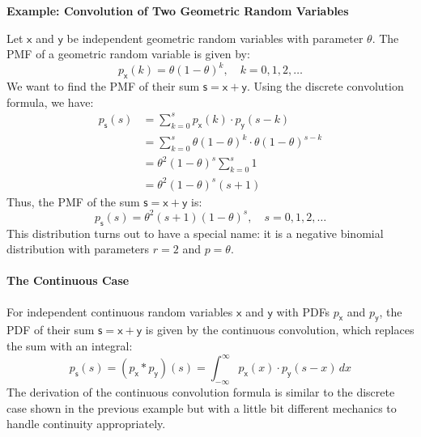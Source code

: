 \begin{exampleBox}
\textbf{Example: Convolution of Two Geometric Random Variables}

Let $\mathsf{x}$ and $\mathsf{y}$ be independent geometric random variables with parameter $\theta$. The PMF of a geometric random variable is given by:
\begin{equation}
    p_{\mathsf{x}}(k) = \theta (1-\theta)^{k} , \quad k = 0, 1, 2, \ldots
\end{equation} 
We want to find the PMF of their sum $\mathsf{s} = \mathsf{x} + \mathsf{y}$. Using the discrete convolution formula, we have:
\begin{align}
    p_{\mathsf{s}}(s) &= \sum_{k=0}^{s} p_{\mathsf{x}}(k) \cdot p_{\mathsf{y}}(s-k) \\
    &= \sum_{k=0}^{s} \theta (1-\theta)^{k} \cdot \theta (1-\theta)^{s-k} \\
    &= \theta^2 (1-\theta)^{s} \sum_{k=0}^{s} 1 \\
    &= \theta^2 (1-\theta)^{s} (s + 1)
\end{align}
Thus, the PMF of the sum $\mathsf{s} = \mathsf{x} + \mathsf{y}$ is:
\begin{equation}
    p_{\mathsf{s}}(s) = \theta^2 (s + 1) (1-\theta)^{s}, \quad s = 0, 1, 2, \ldots
\end{equation}
This distribution turns out to have a special name: it is a negative binomial distribution with parameters $r=2$ and $p=\theta$.
\end{exampleBox}

\paragraph*{The Continuous Case}
For independent continuous random variables $\mathsf{x}$ and $\mathsf{y}$ with PDFs $p_{\mathsf{x}}$ and $p_{\mathsf{y}}$, the PDF of their sum $\mathsf{s} = \mathsf{x} + \mathsf{y}$ is given by the continuous convolution, which replaces the sum with an integral:
\begin{equation}
    p_{\mathsf{s}}(s) = (p_{\mathsf{x}} * p_{\mathsf{y}})(s) = \int_{-\infty}^{\infty} p_{\mathsf{x}}(x) \cdot p_{\mathsf{y}}(s-x) \,dx
\end{equation}
The derivation of the continuous convolution formula is similar to the discrete case shown in the previous example but with a little bit different mechanics to handle continuity appropriately.


